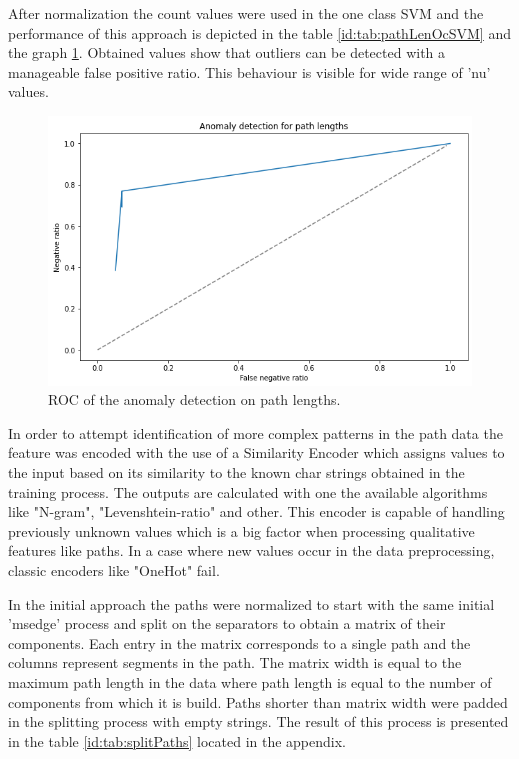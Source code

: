 \documentclass[a4paper,twoside,12pt]{book}
\begin{document}
After normalization the count values were used in the one class SVM and the performance
of this approach is depicted in the table \ref{id:tab:pathLenOcSVM} and the graph \ref{fig:pathLenROC}. 
Obtained values show that outliers can be detected with a manageable false positive ratio. This 
behaviour is visible for wide range of 'nu' values. 

\begin{figure}
	\centering
	\includegraphics[scale=0.9]{images/PathLenROC}
	\caption{ROC of the anomaly detection on path lengths.}
	\label{fig:pathLenROC}
 \end{figure}

In order to attempt identification of more complex patterns in the path data the feature was encoded with
the use of a Similarity Encoder which assigns values to the input based on its similarity 
to the known char strings obtained in the training process. The outputs are calculated with 
one the available algorithms like "N-gram", "Levenshtein-ratio" and other. This encoder is
capable of handling previously unknown values which is a big factor when processing 
qualitative features like paths. In a case where new values occur in the data preprocessing,
classic encoders like "OneHot" fail. 

In the initial approach the paths were normalized to start with the same initial 'msedge' 
process and split on the separators to obtain a matrix of their components. Each entry in the
matrix corresponds to a single path and the columns represent segments in the path. The matrix
width is equal to the maximum path length in the data where path length is equal to the number
of components from which it is build. Paths shorter than matrix width were padded in the splitting
process with empty strings. The result of this process is presented in the table \ref{id:tab:splitPaths} 
located in the appendix. 
\end{document}
